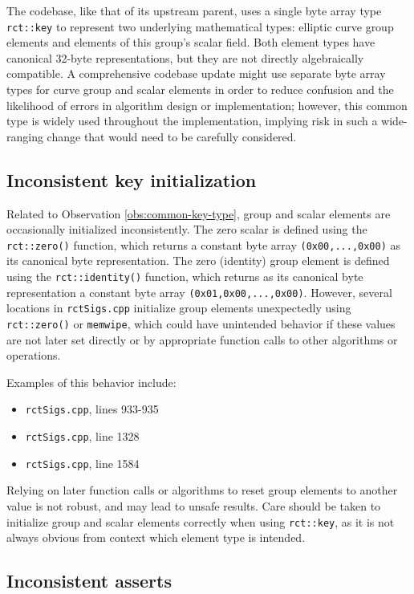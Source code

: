 \documentclass{article}
\begin{document}
The codebase, like that of its upstream parent, uses a single byte array type \texttt{rct::key} to represent two underlying mathematical types: elliptic curve group elements and elements of this group's scalar field.
Both element types have canonical 32-byte representations, but they are not directly algebraically compatible.
A comprehensive codebase update might use separate byte array types for curve group and scalar elements in order to reduce confusion and the likelihood of errors in algorithm design or implementation; however, this common type is widely used throughout the implementation, implying risk in such a wide-ranging change that would need to be carefully considered.


\subsection{Inconsistent key initialization}
\label{obs:key-initialization}

Related to Observation \ref{obs:common-key-type}, group and scalar elements are occasionally initialized inconsistently.
The zero scalar is defined using the \texttt{rct::zero()} function, which returns a constant byte array \texttt{(0x00,...,0x00)} as its canonical byte representation.
The zero (identity) group element is defined using the \texttt{rct::identity()} function, which returns as its canonical byte representation a constant byte array \texttt{(0x01,0x00,...,0x00)}.
However, several locations in \texttt{rctSigs.cpp} initialize group elements unexpectedly using \texttt{rct::zero()} or \texttt{memwipe}, which could have unintended behavior if these values are not later set directly or by appropriate function calls to other algorithms or operations.

Examples of this behavior include:
\begin{itemize}
	\item \texttt{rctSigs.cpp}, lines 933-935
	\item \texttt{rctSigs.cpp}, line 1328
	\item \texttt{rctSigs.cpp}, line 1584
\end{itemize}
Relying on later function calls or algorithms to reset group elements to another value is not robust, and may lead to unsafe results.
Care should be taken to initialize group and scalar elements correctly when using \texttt{rct::key}, as it is not always obvious from context which element type is intended.


\subsection{Inconsistent asserts}
\label{obs:asserts}
\end{document}
